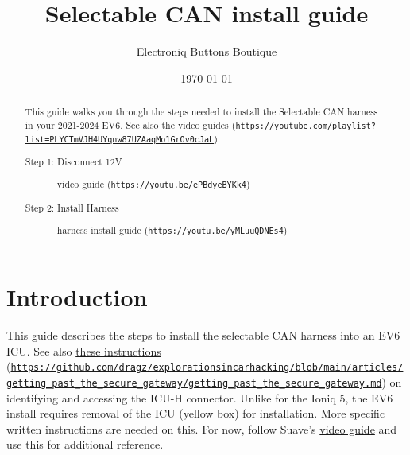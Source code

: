 \documentclass[superscriptaddress,onecolumn,floatfix]{revtex4-2}
\begin{document}
                            
\begin{abstract}
  This guide walks you through the steps needed to install the Selectable CAN harness in your 2021-2024 EV6. See also the \href{https://youtube.com/playlist?list=PLYCTmVJH4UYqnw87UZAaqMo1GrOv0cJaL}{video guides} (\href{https://youtube.com/playlist?list=PLYCTmVJH4UYqnw87UZAaqMo1GrOv0cJaL}{\nolinkurl{https://youtube.com/playlist?list=PLYCTmVJH4UYqnw87UZAaqMo1GrOv0cJaL}}):
  \begin{description}
    \item[Step 1: Disconnect 12V] \href{https://youtu.be/ePBdyeBYKk4}{video guide} (\href{https://youtu.be/ePBdyeBYKk4}{\nolinkurl{https://youtu.be/ePBdyeBYKk4}})
    \item[Step 2: Install Harness] \href{https://youtu.be/yMLuuQDNEs4}{harness install guide} (\href{https://youtu.be/yMLuuQDNEs4}{\nolinkurl{https://youtu.be/yMLuuQDNEs4}})
  \end{description}
\end{abstract}
\title{Selectable CAN install guide}
\author{Electroniq Buttons Boutique}
\date{\today}

\maketitle


\section{Introduction}
This guide describes the steps to install the selectable CAN harness into an EV6 ICU. See also \href{https://github.com/dragz/explorationsincarhacking/blob/main/articles/getting_past_the_secure_gateway/getting_past_the_secure_gateway.md}{these instructions} (\href{https://github.com/dragz/explorationsincarhacking/blob/main/articles/getting_past_the_secure_gateway/getting_past_the_secure_gateway.md}{\nolinkurl{https://github.com/dragz/explorationsincarhacking/blob/main/articles/getting_past_the_secure_gateway/getting_past_the_secure_gateway.md}}) on identifying and accessing the ICU-H connector. Unlike for the Ioniq 5, the EV6 install requires removal of the ICU (yellow box) for installation. More specific written instructions are needed on this. For now, follow Suave's \href{https://youtu.be/yMLuuQDNEs4}{video guide} and use this for additional reference.
\end{document}
